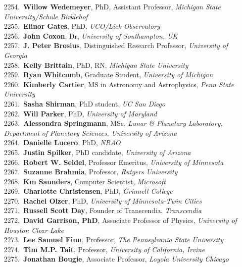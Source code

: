2254.~{\bf Willow Wedemeyer}, PhD, Assistant Professor, {\sl Michigan State University/Schule Birklehof} \\
2255.~{\bf Elinor Gates}, PhD, {\sl UCO/Lick Observatory} \\
2256.~{\bf John Coxon}, Dr, {\sl University of Southampton, UK} \\
2257.~{\bf J. Peter Brosius}, Distinguished Research Professor, {\sl University of Georgia} \\
2258.~{\bf Kelly Brittain}, PhD, RN, {\sl Michigan State University } \\
2259.~{\bf Ryan Whitcomb}, Graduate Student, {\sl University of Michigan} \\
2260.~{\bf Kimberly Cartier}, MS in Astronomy and Astrophysics, {\sl Penn State University} \\
2261.~{\bf Sasha Shirman}, PhD student, {\sl UC San Diego} \\
2262.~{\bf Will Parker}, PhD, {\sl University of Maryland} \\
2263.~{\bf Alessondra Springmann}, MSc, {\sl Lunar \& Planetary Laboratory, Department of Planetary Sciences, University of Arizona} \\
2264.~{\bf Danielle Lucero}, PhD, {\sl NRAO} \\
2265.~{\bf Justin Spilker}, PhD candidate, {\sl University of Arizona} \\
2266.~{\bf Robert W. Seidel}, Professor Emeritus, {\sl University of Minnesota} \\
2267.~{\bf Suzanne Brahmia}, Professor, {\sl Rutgers University} \\
2268.~{\bf Km Saunders}, Computer Scientist, {\sl Microsoft } \\
2269.~{\bf Charlotte Christensen}, PhD, {\sl Grinnell College} \\
2270.~{\bf Rachel Olzer}, PhD, {\sl University of Minnesota-Twin Cities} \\
2271.~{\bf Russell Scott Day}, Founder of Transcendia, {\sl Transcendia} \\
2272.~{\bf David Garrison, PhD}, Associate Professor of Physics, {\sl University of Houston Clear Lake} \\
2273.~{\bf Lee Samuel Finn}, Professor, {\sl The Pennsylvania State University} \\
2274.~{\bf Tim M.P. Tait}, Professor, {\sl University of California, Irvine} \\
2275.~{\bf Jonathan Bougie}, Associate Professor, {\sl Loyola University Chicago} \\
